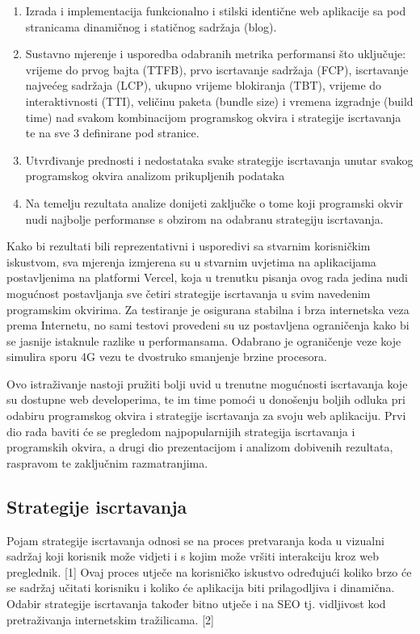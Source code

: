 \begin{enumerate}
    \item Izrada i implementacija funkcionalno i stilski identične web aplikacije sa pod stranicama dinamičnog i statičnog sadržaja (blog).
    \item Sustavno mjerenje i usporedba odabranih metrika performansi što uključuje: vrijeme do prvog bajta (TTFB), prvo iscrtavanje sadržaja (FCP), iscrtavanje najvećeg sadržaja (LCP), ukupno vrijeme blokiranja (TBT), vrijeme do interaktivnosti (TTI), veličinu paketa (bundle size) i vremena izgradnje (build time) nad svakom kombinacijom programskog okvira i strategije iscrtavanja te na sve 3 definirane pod stranice.
    \item Utvrđivanje prednosti i nedostataka svake strategije iscrtavanja unutar svakog programskog okvira analizom prikupljenih podataka
    \item Na temelju rezultata analize donijeti zaključke o tome koji programski okvir nudi najbolje performanse s obzirom na odabranu strategiju iscrtavanja.
\end{enumerate}

Kako bi rezultati bili reprezentativni i usporedivi sa stvarnim korisničkim iskustvom, sva mjerenja izmjerena su u stvarnim uvjetima na aplikacijama postavljenima na platformi Vercel, koja u trenutku pisanja ovog rada jedina nudi mogućnost postavljanja sve četiri strategije iscrtavanja u svim navedenim programskim okvirima. Za testiranje je osigurana stabilna i brza internetska veza prema Internetu, no sami testovi provedeni su uz postavljena ograničenja kako bi se jasnije istaknule razlike u performansama. Odabrano je ograničenje veze koje simulira sporu 4G vezu te dvostruko smanjenje brzine procesora.

\bigskip

Ovo istraživanje nastoji pružiti bolji uvid u trenutne mogućnosti iscrtavanja koje su dostupne web developerima, te im time pomoći u donošenju boljih odluka pri odabiru programskog okvira i strategije iscrtavanja za svoju web aplikaciju. Prvi dio rada baviti će se pregledom najpopularnijih strategija iscrtavanja i programskih okvira, a drugi dio prezentacijom i analizom dobivenih rezultata, raspravom te zaključnim razmatranjima.

\subsection{Strategije iscrtavanja}

Pojam strategije iscrtavanja odnosi se na proces pretvaranja koda u vizualni sadržaj koji korisnik može vidjeti i s kojim može vršiti interakciju kroz web preglednik. [1] Ovaj proces utječe na korisničko iskustvo određujući koliko brzo će se sadržaj učitati korisniku i koliko će aplikacija biti prilagodljiva i dinamična.
Odabir strategije iscrtavanja također bitno utječe i na SEO tj. vidljivost kod pretraživanja internetskim tražilicama. [2]

